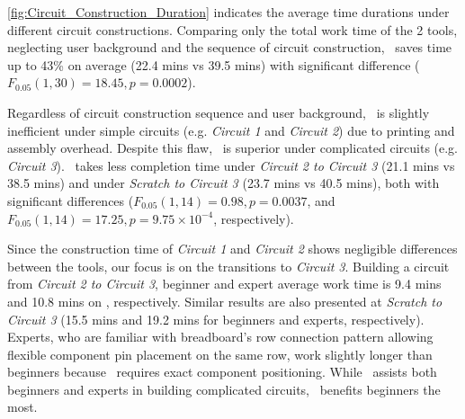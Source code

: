 \autoref{fig:Circuit_Construction_Duration} indicates the average time durations under different circuit constructions. Comparing only the total work time of the 2 tools, neglecting user background and the sequence of circuit construction, \papertitle\ saves time up to 43\% on average  (22.4 mins vs 39.5 mins) with significant difference ($F_{0.05} (1, 30) = 18.45, p = 0.0002$).


Regardless of circuit construction sequence and user background, \papertitle\ is slightly inefficient under simple circuits (e.g. \textit{Circuit 1} and \textit{Circuit 2}) due to printing and assembly overhead. Despite this flaw, \papertitle\ is superior under complicated circuits (e.g. \textit{Circuit 3}). \papertitle\ takes less completion time under \textit{Circuit 2 to Circuit 3} (21.1 mins vs 38.5 mins) and under \textit{Scratch to Circuit 3} (23.7 mins vs 40.5 mins), both with significant differences ($F_{0.05} (1, 14) = 0.98, p = 0.0037$, and $F_{0.05} (1, 14) = 17.25, p = 9.75 \times 10^{-4}$, respectively).


Since the construction time of \textit{Circuit 1} and \textit{Circuit 2} shows negligible differences between the tools, our focus is on the transitions to \textit{Circuit 3}. Building a circuit from \textit{Circuit 2 to Circuit 3}, beginner and expert average work time is 9.4 mins and 10.8 mins on \papertitle, respectively. Similar results are also presented at \textit{Scratch to Circuit 3} (15.5 mins and 19.2 mins for beginners and experts, respectively). Experts, who are familiar with breadboard's row connection pattern allowing flexible component pin placement on the same row, work slightly longer than beginners because \papertitle\ requires exact component positioning. While \papertitle\ assists both beginners and experts in building complicated circuits, \papertitle\ benefits beginners the most.


